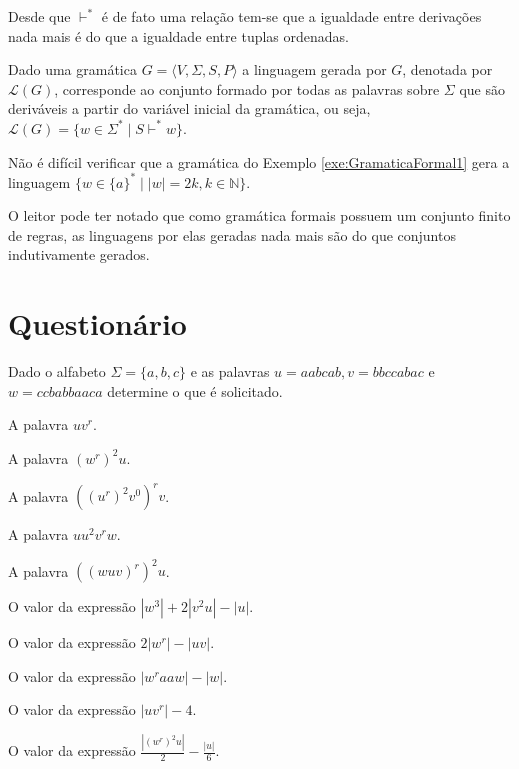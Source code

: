 Desde que $\vdash^*$ é de fato uma relação tem-se que a igualdade entre derivações nada mais é do que a igualdade entre tuplas ordenadas.

\begin{definition}\label{def:LinaugemGramatica}
	Dado uma gramática $G = \langle V, \Sigma, S, P \rangle$ a linguagem gerada por $G$, denotada por $\mathcal{L}(G)$, corresponde ao conjunto formado por todas as palavras sobre $\Sigma$ que são deriváveis a partir do variável inicial da gramática, ou seja, $\mathcal{L}(G) = \{w \in \Sigma^* \mid S \vdash^* w\}$.
\end{definition}

\begin{example}
	Não é difícil verificar que a gramática do Exemplo \ref{exe:GramaticaFormal1} gera a linguagem $\{w \in \{a\}^* \mid |w| = 2k, k \in \mathbb{N}\}$.
\end{example}

O leitor pode ter notado que como gramática formais possuem um conjunto finito de regras, as linguagens por elas geradas nada mais são do que conjuntos indutivamente gerados.

\section{Questionário}\label{sec:Questionario1part4}

\begin{problem}\label{prob:Linguagem1}
	Dado o alfabeto $\Sigma = \{a, b, c\}$ e as palavras $u = aabcab, v = bbccabac$ e $w = ccbabbaaca$ determine o que é solicitado.
\end{problem}

\begin{exerList}
	\item A palavra $uv^r$.
	\item A palavra $(w^r)^2u$.
	\item A palavra $((u^r)^2v^0)^rv$.
	\item A palavra $uu^2v^rw$.
	\item A palavra $((wuv)^r)^2u$.
	\item O valor da expressão $|w^3| + 2|v^2u| - |u|$.
	\item O valor da expressão $2|w^r| - |uv|$.
	\item O valor da expressão $|w^raaw| - |w|$.
	\item O valor da expressão $|uv^r| - 4$.
	\item O valor da expressão $\frac{|(w^r)^2u|}{2} - \frac{|u|}{6}$.
\end{exerList}

